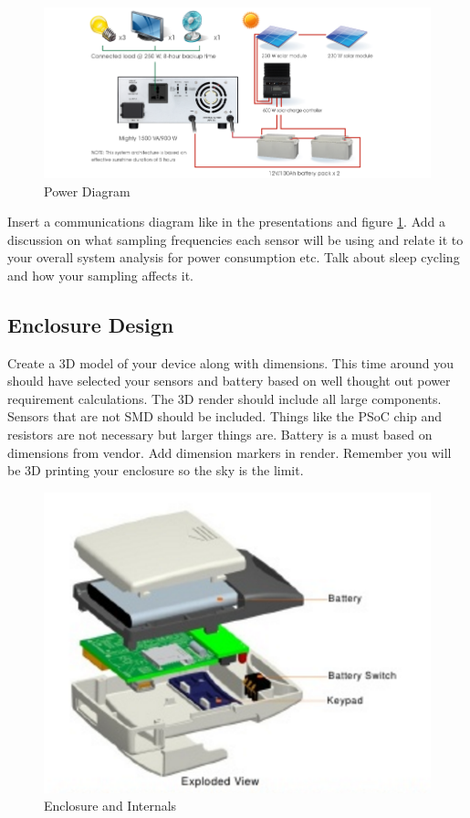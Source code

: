 \documentclass{sig-alternate-ipsn13}
\begin{document}
\begin{figure}
  \centering 
	\includegraphics[width=\columnwidth]{images/power.png}
    \caption{Power Diagram}
    \label{fig:PowerDiagram}
\end{figure}

Insert a communications diagram like in the presentations and figure \ref{fig:PowerDiagram}. Add a discussion on what sampling frequencies each sensor will be using and relate it to your overall system analysis for power consumption etc. Talk about sleep cycling and how your sampling affects it.

\subsection{Enclosure Design}

Create a 3D model of your device along with dimensions. This time around you should have selected your sensors and battery based on well thought out power requirement calculations. The 3D render should include all large components. Sensors that are not SMD should be included. Things like the PSoC chip and resistors are not necessary but larger things are. Battery is a must based on dimensions from vendor. Add dimension markers in render. Remember you will be 3D printing your enclosure so the sky is the limit.

\begin{figure}
  \centering 
	\includegraphics[width=\columnwidth]{images/enclosure.png}
    \caption{Enclosure and Internals}
    \label{fig:Enclosure}
\end{figure}
\end{document}
